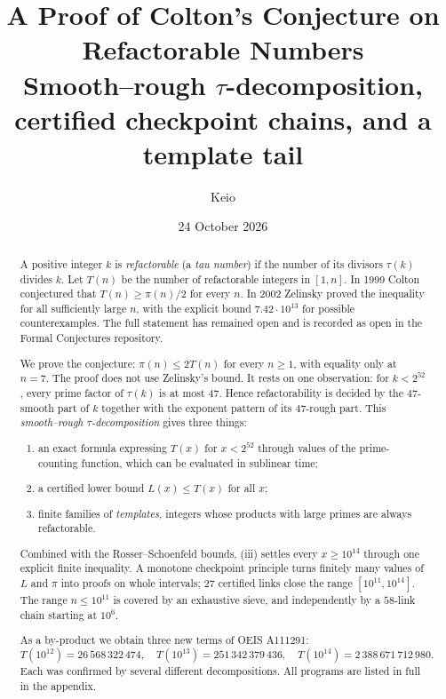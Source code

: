 \documentclass[11pt,a4paper]{article}
\title{\bfseries A Proof of Colton's Conjecture on Refactorable Numbers\\[6pt]
\large Smooth--rough $\tau$-decomposition, certified checkpoint chains, and a template tail}
\author{Keio}
\date{24 October 2026}
\theoremstyle{definition}
\begin{document}
\maketitle

\begin{abstract}
A positive integer $k$ is \emph{refactorable} (a \emph{tau number}) if the number of its divisors $\tau(k)$ divides $k$. Let $T(n)$ be the number of refactorable integers in $[1,n]$. In 1999 Colton conjectured that $T(n)\ge \pi(n)/2$ for every $n$. In 2002 Zelinsky proved the inequality for all sufficiently large $n$, with the explicit bound $7.42\cdot10^{13}$ for possible counterexamples. The full statement has remained open and is recorded as open in the Formal Conjectures repository.

We prove the conjecture: $\pi(n)\le 2T(n)$ for every $n\ge1$, with equality only at $n=7$. The proof does not use Zelinsky's bound. It rests on one observation: for $k<2^{52}$, every prime factor of $\tau(k)$ is at most $47$. Hence refactorability is decided by the $47$-smooth part of $k$ together with the exponent pattern of its $47$-rough part. This \emph{smooth--rough $\tau$-decomposition} gives three things:
\begin{enumerate}
\item[(i)] an exact formula expressing $T(x)$ for $x<2^{52}$ through values of the prime-counting function, which can be evaluated in sublinear time;
\item[(ii)] a certified lower bound $L(x)\le T(x)$ for all $x$;
\item[(iii)] finite families of \emph{templates}, integers whose products with large primes are always refactorable.
\end{enumerate}
Combined with the Rosser--Schoenfeld bounds, (iii) settles every $x\ge10^{14}$ through one explicit finite inequality. A monotone checkpoint principle turns finitely many values of $L$ and $\pi$ into proofs on whole intervals; $27$ certified links close the range $[10^{11},10^{14}]$. The range $n\le10^{11}$ is covered by an exhaustive sieve, and independently by a $58$-link chain starting at $10^{6}$.

As a by-product we obtain three new terms of OEIS A111291:
\[
T(10^{12})=26\,568\,322\,474,\quad T(10^{13})=251\,342\,379\,436,\quad T(10^{14})=2\,388\,671\,712\,980.
\]
Each was confirmed by several different decompositions. All programs are listed in full in the appendix.
\end{abstract}
\end{document}

